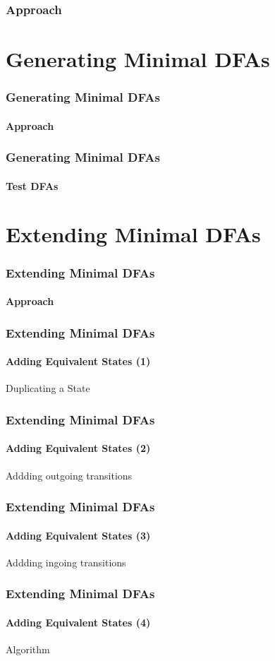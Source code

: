 \documentclass[handout,10pt]{beamer}%
\begin{document}
	\begin{frame}
		\frametitle{Approach}
		
		
	\end{frame}
	
	
	\section{Generating Minimal DFAs}
	
	\begin{frame}
		\frametitle{Generating Minimal DFAs}
		\framesubtitle{Approach}
	
	
	\end{frame}

	\begin{frame}
		\frametitle{Generating Minimal DFAs}
		\framesubtitle{Test DFAs}
	
	
	\end{frame}
	
	
	\section{Extending Minimal DFAs}
	
	\begin{frame}
		\frametitle{Extending Minimal DFAs}
		\framesubtitle{Approach}
	
	
	\end{frame}

	\begin{frame}
		\frametitle{Extending Minimal DFAs}
		\framesubtitle{Adding Equivalent States (1)}
	
		Duplicating a State
	
	\end{frame}

	\begin{frame}
		\frametitle{Extending Minimal DFAs}
		\framesubtitle{Adding Equivalent States (2)}
		
		Addding outgoing transitions
	
	\end{frame}

	\begin{frame}
		\frametitle{Extending Minimal DFAs}
		\framesubtitle{Adding Equivalent States (3)}
		
		Addding ingoing transitions
	
	\end{frame}

	\begin{frame}
		\frametitle{Extending Minimal DFAs}
		\framesubtitle{Adding Equivalent States (4)}
		
		Algorithm
	
	\end{frame}
\end{document}
